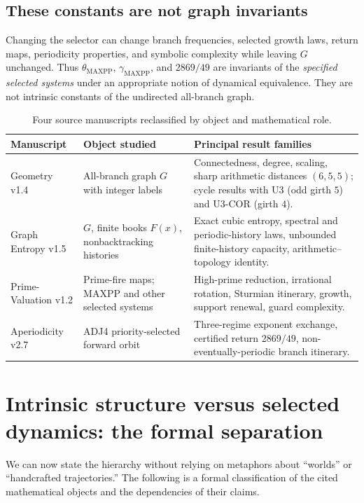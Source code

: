 \documentclass[11pt,a4paper]{article}
\theoremstyle{definition}\newtheorem{definition}[theorem]{Definition}
\begin{document}
\subsection{These constants are not graph invariants}
Changing the selector can change branch frequencies, selected growth laws, return maps, periodicity properties, and symbolic complexity while leaving $G$ unchanged. Thus $\theta_{\mathrm{MAXPP}}$, $\gamma_{\mathrm{MAXPP}}$, and $2869/49$ are invariants of the \emph{specified selected systems} under an appropriate notion of dynamical equivalence. They are not intrinsic constants of the undirected all-branch graph.

\begin{table}[htbp]
\centering\small
\caption{Four source manuscripts reclassified by object and mathematical role.}
\label{tab:papers}
\begin{tabularx}{\textwidth}{@{}p{31mm}p{34mm}X@{}}
\toprule
\textbf{Manuscript} & \textbf{Object studied} & \textbf{Principal result families}\\
\midrule
Geometry v1.4 & All-branch graph $G$ with integer labels & Connectedness, degree, scaling, sharp arithmetic distances $(6,5,5)$; cycle results with U3 (odd girth $5$) and U3-COR (girth $4$).\\
Graph Entropy v1.5 & $G$, finite books $F(x)$, nonbacktracking histories & Exact cubic entropy, spectral and periodic-history laws, unbounded finite-history capacity, arithmetic--topology identity.\\
Prime-Valuation v1.2 & Prime-fire maps; MAXPP and other selected systems & High-prime reduction, irrational rotation, Sturmian itinerary, growth, support renewal, guard complexity.\\
Aperiodicity v2.7 & ADJ4 priority-selected forward orbit & Three-regime exponent exchange, certified return $2869/49$, non-eventually-periodic branch itinerary.\\
\bottomrule
\end{tabularx}
\end{table}


\section{Intrinsic structure versus selected dynamics: the formal separation}
\label{sec:separation}
We can now state the hierarchy without relying on metaphors about ``worlds'' or ``handcrafted trajectories.'' The following is a formal classification of the cited mathematical objects and the dependencies of their claims.
\end{document}
